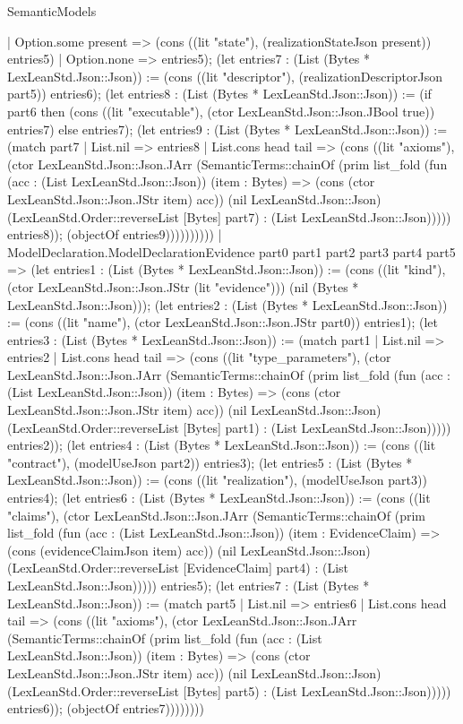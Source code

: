 \begin{lexlean}{SemanticModels}
\begin{semanticmodule}
{      | Option.some present => (cons ((lit "state"), (realizationStateJson present)) entries5)
      | Option.none => entries5); (let entries7 : (List (Bytes * LexLeanStd.Json::Json)) := (cons ((lit "descriptor"), (realizationDescriptorJson part5)) entries6); (let entries8 : (List (Bytes * LexLeanStd.Json::Json)) := (if part6 then (cons ((lit "executable"), (ctor LexLeanStd.Json::Json.JBool true)) entries7) else entries7); (let entries9 : (List (Bytes * LexLeanStd.Json::Json)) := (match part7
      | List.nil => entries8
      | List.cons head tail => (cons ((lit "axioms"), (ctor LexLeanStd.Json::Json.JArr (SemanticTerms::chainOf (prim list_fold (fun (acc : (List LexLeanStd.Json::Json)) (item : Bytes) => (cons (ctor LexLeanStd.Json::Json.JStr item) acc)) (nil LexLeanStd.Json::Json) (LexLeanStd.Order::reverseList [Bytes] part7) : (List LexLeanStd.Json::Json))))) entries8)); (objectOf entries9))))))))))
    | ModelDeclaration.ModelDeclarationEvidence part0 part1 part2 part3 part4 part5 => (let entries1 : (List (Bytes * LexLeanStd.Json::Json)) := (cons ((lit "kind"), (ctor LexLeanStd.Json::Json.JStr (lit "evidence"))) (nil (Bytes * LexLeanStd.Json::Json))); (let entries2 : (List (Bytes * LexLeanStd.Json::Json)) := (cons ((lit "name"), (ctor LexLeanStd.Json::Json.JStr part0)) entries1); (let entries3 : (List (Bytes * LexLeanStd.Json::Json)) := (match part1
      | List.nil => entries2
      | List.cons head tail => (cons ((lit "type_parameters"), (ctor LexLeanStd.Json::Json.JArr (SemanticTerms::chainOf (prim list_fold (fun (acc : (List LexLeanStd.Json::Json)) (item : Bytes) => (cons (ctor LexLeanStd.Json::Json.JStr item) acc)) (nil LexLeanStd.Json::Json) (LexLeanStd.Order::reverseList [Bytes] part1) : (List LexLeanStd.Json::Json))))) entries2)); (let entries4 : (List (Bytes * LexLeanStd.Json::Json)) := (cons ((lit "contract"), (modelUseJson part2)) entries3); (let entries5 : (List (Bytes * LexLeanStd.Json::Json)) := (cons ((lit "realization"), (modelUseJson part3)) entries4); (let entries6 : (List (Bytes * LexLeanStd.Json::Json)) := (cons ((lit "claims"), (ctor LexLeanStd.Json::Json.JArr (SemanticTerms::chainOf (prim list_fold (fun (acc : (List LexLeanStd.Json::Json)) (item : EvidenceClaim) => (cons (evidenceClaimJson item) acc)) (nil LexLeanStd.Json::Json) (LexLeanStd.Order::reverseList [EvidenceClaim] part4) : (List LexLeanStd.Json::Json))))) entries5); (let entries7 : (List (Bytes * LexLeanStd.Json::Json)) := (match part5
      | List.nil => entries6
      | List.cons head tail => (cons ((lit "axioms"), (ctor LexLeanStd.Json::Json.JArr (SemanticTerms::chainOf (prim list_fold (fun (acc : (List LexLeanStd.Json::Json)) (item : Bytes) => (cons (ctor LexLeanStd.Json::Json.JStr item) acc)) (nil LexLeanStd.Json::Json) (LexLeanStd.Order::reverseList [Bytes] part5) : (List LexLeanStd.Json::Json))))) entries6)); (objectOf entries7))))))))
}
\end{semanticmodule}
\end{lexlean}
